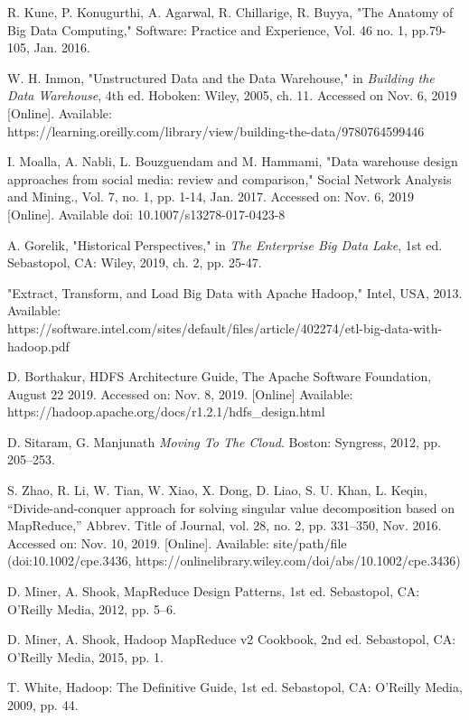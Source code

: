 \documentclass[journal]{IEEEtran}
\begin{document}
	\begin{thebibliography}{1}
		
		R. Kune, P. Konugurthi, A. Agarwal, R. Chillarige, R. Buyya,
		"The Anatomy of Big Data Computing," Software: Practice and Experience,
		Vol. 46 no. 1, pp.79-105, Jan. 2016. 
		
		W. H. Inmon, "Unstructured Data and the Data Warehouse," in 
		\emph{Building the Data Warehouse},
		4th ed. Hoboken: Wiley, 2005, ch. 11.
		Accessed on Nov. 6, 2019 [Online]. 
		Available: \\ https://learning.oreilly.com/library/view/building-the-data/9780764599446
		
		I. Moalla, A. Nabli, L. Bouzguendam and M. Hammami,
		"Data warehouse design approaches from social media: review and comparison,"
		Social Network Analysis and Mining., Vol. 7, no. 1, pp. 1-14, Jan. 2017.
		Accessed on: Nov. 6, 2019 [Online]. 
		Available doi: 10.1007/s13278-017-0423-8
		
		A. Gorelik, "Historical Perspectives," in 
		\emph{The Enterprise Big Data Lake},
		1st ed. Sebastopol, CA: Wiley, 2019, ch. 2, pp. 25-47.
		
		"Extract, Transform, and Load Big Data with Apache Hadoop," Intel, USA, 2013.
		Available:\\ https://software.intel.com/sites/default/files/article/402274/etl-big-data-with-hadoop.pdf
		
		D. Borthakur, HDFS Architecture Guide, The Apache Software Foundation,
		August 22 2019. Accessed on: Nov. 8, 2019. [Online] Available: \\
		https://hadoop.apache.org/docs/r1.2.1/hdfs\_design.html
		
		D. Sitaram, G. Manjunath \textit{Moving To The Cloud}. Boston: Syngress, 2012, pp. 205–253.
		
		S. Zhao, R. Li, W. Tian, W. Xiao, X. Dong, D. Liao, S. U. Khan, L. Keqin, “Divide-and-conquer approach for solving singular value decomposition based on MapReduce,” Abbrev. Title of Journal, vol. 28, no. 2, pp. 331–350, Nov. 2016. Accessed on: Nov. 10, 2019. [Online]. Available: site/path/file (doi:10.1002/cpe.3436, https://onlinelibrary.wiley.com/doi/abs/10.1002/cpe.3436)
		
	 	D. Miner, A. Shook, MapReduce Design Patterns, 1st ed. Sebastopol, CA: O'Reilly Media, 2012,
	 	pp. 5–6.
	 	
	 	D. Miner, A. Shook, Hadoop MapReduce v2 Cookbook, 2nd ed. Sebastopol, CA: O'Reilly Media,
	 	2015, pp. 1.
	 	
	 	T. White, Hadoop: The Definitive Guide, 1st ed. Sebastopol,
	 	CA: O'Reilly Media, 2009, pp. 44.
		
	\end{thebibliography}
	
	
\end{document}
